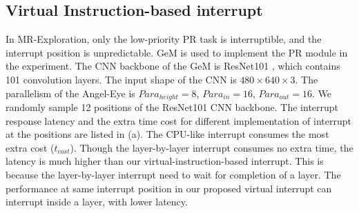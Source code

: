 


\subsection{Virtual Instruction-based interrupt }

In MR-Exploration, only the low-priority PR task is interruptible, and the interrupt position is unpredictable. GeM \cite{radenovic2018fine} is used to implement the PR module in the experiment.
The CNN backbone of the GeM is ResNet101 \cite{he2016deep}, which contains 101 convolution layers. The input shape of the CNN is $480 \times 640 \times 3$. The parallelism of the Angel-Eye is $Para_{height}=8$, $Para_{in}=16$, $Para_{out}=16$. 
We randomly sample 12 positions of the ResNet101 CNN backbone. The interrupt response latency and the extra time cost for different implementation of interrupt at the positions are listed in (a).
The CPU-like interrupt consumes the most extra cost ($t_{cost}$). Though the layer-by-layer interrupt consumes no extra time, the latency is much higher than our virtual-instruction-based interrupt. 
This is because the layer-by-layer interrupt need to wait for completion of a layer. The performance at same interrupt position in our proposed virtual interrupt can interrupt inside a layer, with lower latency.

\label{sec:viexp}

